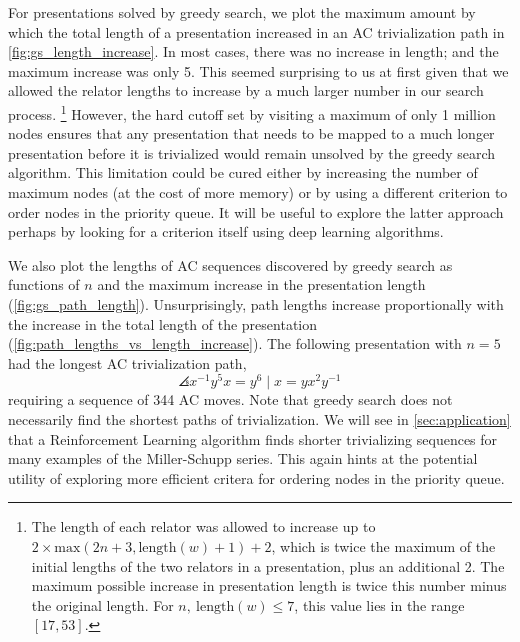 For presentations solved by greedy search, we plot the maximum amount by which the total length of a presentation increased in an AC trivialization path in \autoref{fig:gs_length_increase}. In most cases, there was no increase in length; and the maximum increase was only 5. This seemed surprising to us at first given that we allowed the relator lengths to increase by a much larger number in our search process. 
\footnote{The length of each relator was allowed to increase up to \(2 \times \text{max}(2n+3, \text{length}(w)+1) + 2\), which is twice the maximum of the initial lengths of the two relators in a presentation, plus an additional 2. 
The maximum possible increase in presentation length is twice this number minus the original length. For $n, \ \text{length}(w) \leq 7$, this value lies in the range $[17, 53]$. 
} 
However, the hard cutoff set by visiting a maximum of only 1 million nodes ensures that any presentation that needs to be mapped to a much longer presentation before it is trivialized would remain unsolved by the greedy search algorithm. This limitation could be cured either by increasing the number of maximum nodes (at the cost of more memory) or by using a different criterion to order nodes in the priority queue. It will be useful to explore the latter approach perhaps by looking for a criterion itself using deep learning algorithms.
\newline

We also plot the lengths of AC sequences discovered by greedy search as functions of $n$ and the maximum increase in the presentation length (\autoref{fig:gs_path_length}). Unsurprisingly, path lengths increase proportionally with the increase in the total length of the presentation (\autoref{fig:path_lengths_vs_length_increase}). 
The following presentation with $n=5$ had the longest AC trivialization path,
\[
\angles{x^{-1} y^5 x = y^6 \mid  x = y x^2 y^{-1}}
\]
requiring a sequence of 344 AC moves. Note that greedy search does not necessarily find the shortest paths of trivialization. We will see in \autoref{sec:application} that a Reinforcement Learning algorithm finds shorter trivializing sequences for many examples of the Miller-Schupp series. This again hints at the potential utility of exploring more efficient critera for ordering nodes in the priority queue.  
	
